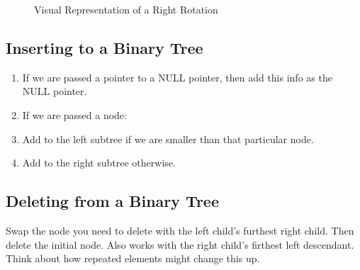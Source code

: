\documentclass[a4paper,12pt]{report}
\begin{document}
\begin{figure}%
    \centering
    \qquad
    \caption{Visual Representation of a Right Rotation}%
    \label{fig:example}%
\end{figure}

\subsection{Inserting to a Binary Tree}
\begin{enumerate}
\item If we are passed a pointer to a NULL pointer, then add this info as the NULL pointer.
\item If we are passed a node:
\item Add to the left subtree if we are smaller than that particular node.
\item Add to the right subtree otherwise.
\end{enumerate}


\subsection{Deleting from a Binary Tree}
Swap the node you need to delete with the left child's furthest right child. Then delete the initial node. Also works with the right child's firthest left descendant. Think about how repeated elements might change this up. 
\end{document}
